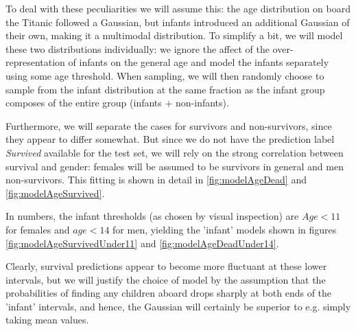 \documentclass[11.5pt]{article}
\newcommand{\ti}[1] {\textit{#1}}
\begin{document}



To deal with these peculiarities we will assume this: the age distribution on board the Titanic followed a Gaussian, but infants introduced an additional Gaussian of their own, making it a multimodal distribution. To simplify a bit, we will model these two distributions individually: we ignore the affect of the over-representation of infants on the general age and model the infants separately using some age threshold. When sampling, we will then randomly choose to sample from  the infant distribution at the same fraction as the infant group composes of the entire group (infants + non-infants). 

Furthermore, we will separate the cases for survivors and non-survivors, since they appear to differ somewhat. But since we do not have the prediction label \ti{Survived} available for the test set, we will rely on the strong correlation between survival and gender: females will be assumed to be survivors  in general and men non-survivors. This fitting is shown in detail in \ref{fig:modelAgeDead} and \ref{fig:modelAgeSurvived}. 

In numbers, the infant thresholds (as chosen by visual inspection) are $Age < 11$ for females and $age <14$ for men, yielding the 'infant' models shown in figures \ref{fig:modelAgeSurvivedUnder11} and \ref{fig:modelAgeDeadUnder14}. 	





Clearly, survival predictions appear to become more fluctuant at these lower intervals, but we will justify the choice of model by the assumption that the probabilities of finding any children aboard drops sharply at both ends of the 'infant' intervals, and hence, the Gaussian will certainly be superior to e.g.  simply taking mean values. 
\end{document}
